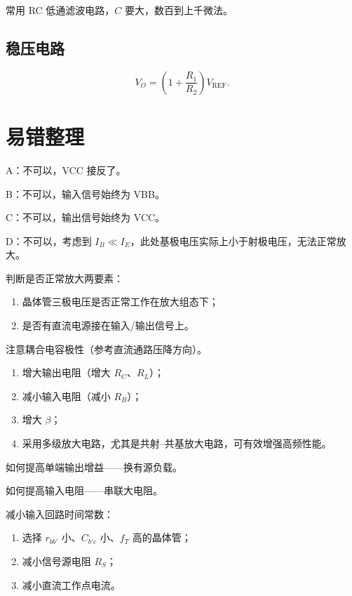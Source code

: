 \documentclass[UTF8,fontset=fandol,zihao=5]{ctexart}
\begin{document}
{常用 RC 低通滤波电路，$C$ 要大，数百到上千微法。

\subsection{稳压电路}

\[
  V_O=\left(1+\frac{R_1}{R_2}\right)V_{\mathrm{REF}}.
\]

\section{易错整理}

\begin{methodbox}[【易错】判断电路能否放大正弦交流信号]
A：不可以，VCC 接反了。

B：不可以，输入信号始终为 VBB。

C：不可以，输出信号始终为 VCC。

D：不可以，考虑到 $I_B\ll I_E$，此处基极电压实际上小于射极电压，无法正常放大。

判断是否正常放大两要素：
\begin{enumerate}
  \item 晶体管三极电压是否正常工作在放大组态下；
  \item 是否有直流电源接在输入/输出信号上。
\end{enumerate}
\end{methodbox}

\begin{methodbox}[【易错】耦合电容]
注意耦合电容极性（参考直流通路压降方向）。
\end{methodbox}

\begin{methodbox}[【方法】如何提高放大倍数]
\begin{enumerate}
  \item 增大输出电阻（增大 $R_C$、$R_L$）；
  \item 减小输入电阻（减小 $R_B$）；
  \item 增大 $\beta$；
  \item 采用多级放大电路，尤其是共射--共基放大电路，可有效增强高频性能。
\end{enumerate}

如何提高单端输出增益——换有源负载。

如何提高输入电阻——串联大电阻。
\end{methodbox}

\begin{methodbox}[【方法】如何改善高频特性]
减小输入回路时间常数：
\begin{enumerate}
  \item 选择 $r_{bb'}$ 小、$C_{b'c}$ 小、$f_T$ 高的晶体管；
  \item 减小信号源电阻 $R_S$；
  \item 减小直流工作点电流。
\end{enumerate}
\end{methodbox}

}
\end{document}
